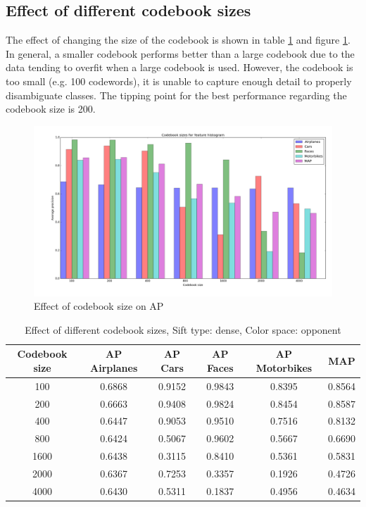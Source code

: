 \subsection{Effect of different codebook sizes}
The effect of changing the size of the codebook is shown in table \ref{tab:clusters} and figure \ref{plot:codebook}. In general, a smaller codebook performs better than a large codebook due to the data tending to overfit when a large codebook is used. However, the codebook is too small (e.g. 100 codewords), it is unable to capture enough detail to properly disambiguate classes. The tipping point for the best performance regarding the codebook size is 200.

\begin{figure}[H]
\includegraphics[width=\textwidth]{../plots/cluster_size_feature_histograms}
\caption{Effect of codebook size on AP}
\label{plot:codebook}
\end{figure}
\begin{table}[H]
\begin{center}
\begin{tabular}{|c|ccccc|}
\hline
\textbf{Codebook size} & \textbf{AP Airplanes} & \textbf{AP Cars} & \textbf{AP Faces} & \textbf{AP Motorbikes} & \textbf{MAP}\\
\hline
100& 0.6868 & 0.9152 & 0.9843 & 0.8395 & 0.8564\\
200 & 0.6663 & 0.9408 & 0.9824 & 0.8454 & 0.8587\\
400 & 0.6447 & 0.9053 & 0.9510 & 0.7516 & 0.8132\\
800 & 0.6424 & 0.5067 & 0.9602 & 0.5667 & 0.6690\\
1600 & 0.6438 & 0.3115 & 0.8410 & 0.5361 & 0.5831\\
2000 & 0.6367 & 0.7253 & 0.3357 & 0.1926 & 0.4726\\
4000 & 0.6430 & 0.5311 & 0.1837 & 0.4956 & 0.4634\\
\hline
\end{tabular}
\caption{Effect of different codebook sizes, Sift type: dense, Color space: opponent}
\label{tab:clusters}
\end{center}
\end{table}
